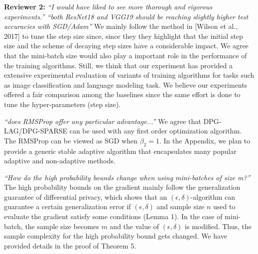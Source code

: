 \documentclass{article}
\begin{document}
\textbf{Reviewer 2:}
\textit{``I would have liked to see more thorough and rigorous experiments.'' ``both ResNet18 and VGG19 should be reaching slightly higher test accuracies with SGD/Adam''}
We mainly follow the method in [Wilson et al., 2017] to tune the step size since, since they they highlight that the initial step size and the scheme of decaying step sizes have a considerable impact. 
We agree that the mini-batch size would also play a important role in the performance of the training algorithms. 
Still, we think that our experiment has provided a extensive experimental evaluation of variants of training algorithms for tasks such as image classification and language modeling task. 
We believe our experiments offered a fair comparison among the baselines since the same effort is done to tune the hyper-parameters (step size). \vspace{-5pt}

    
\textit{``does RMSProp offer any particular advantage...''}
We agree that DPG-LAG/DPG-SPARSE can be used with any first order optimization algorithm. 
The RMSProp can be viewed as SGD when $\beta_2 = 1$. 
In the Appendix, we plan to provide a generic stable adaptive algorithm that encapsulates many popular adaptive and non-adaptive methods. \vspace{-5pt}
    
    
\textit{``How do the high probability bounds change when using mini-batches of size m?''}
The high probability bounds on the gradient mainly follow the generalization guarantee of differential privacy, which shows that an $(\epsilon, \delta)$-algorithm can guarantee a certain  generalization error if $(\epsilon, \delta)$ and sample size $n$ used to evaluate the gradient satisfy some conditions (Lemma 1). 
In the case of mini-batch, the sample size becomes $m$ and the value of $(\epsilon, \delta)$ is modified. 
Thus, the sample complexity for the high probability bound gets changed. 
We have provided details in the proof of Theorem 5. \vspace{-5pt}
    
\end{document}
